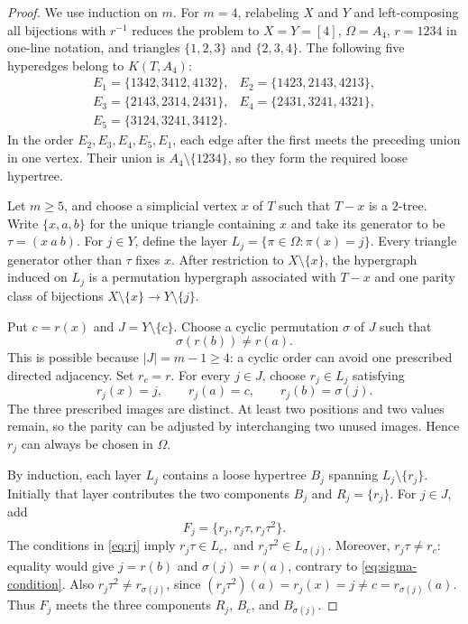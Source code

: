 \documentclass[10pt,a4paper]{amsart}
\begin{document}
\begin{proof}
We use induction on $m$. For $m=4$, relabeling $X$ and $Y$ and
left-composing all bijections with $r^{-1}$ reduces the problem to
$X=Y=[4]$, $\Omega=A_4$, $r=1234$ in one-line notation, and triangles
$\{1,2,3\}$ and $\{2,3,4\}$. The following five hyperedges belong to
$K(T,A_4)$:
\[
\begin{array}{ll}
 E_1=\{1342,3412,4132\},&
 E_2=\{1423,2143,4213\},\\
 E_3=\{2143,2314,2431\},&
 E_4=\{2431,3241,4321\},\\
 E_5=\{3124,3241,3412\}.&
\end{array}
\]
In the order $E_2,E_3,E_4,E_5,E_1$, each edge after the first meets the
preceding union in one vertex. Their union is $A_4\setminus\{1234\}$, so
they form the required loose hypertree.

Let $m\geq5$, and choose a simplicial vertex $x$ of $T$ such that $T-x$ is a
$2$-tree. Write $\{x,a,b\}$ for the unique triangle containing $x$ and take
its generator to be
$
 \tau=(x\ a\ b).
$
For $j\in Y$, define the layer
$
 L_j=\{\pi\in\Omega:\pi(x)=j\}.
$
Every triangle generator other than $\tau$ fixes $x$. After restriction to
$X\setminus\{x\}$, the hypergraph induced on $L_j$ is a permutation
hypergraph associated with $T-x$ and one parity class of bijections
$X\setminus\{x\}\to Y\setminus\{j\}$.

Put $c=r(x)$ and $J=Y\setminus\{c\}$. Choose a cyclic permutation $\sigma$
of $J$ such that
\begin{equation}\label{eq:sigma-condition}
 \sigma(r(b))\neq r(a).
\end{equation}
This is possible because $|J|=m-1\geq4$: a cyclic order can avoid one
prescribed directed adjacency. Set $r_c=r$. For every $j\in J$, choose
$r_j\in L_j$ satisfying
\begin{equation}\label{eq:rj}
 r_j(x)=j,\qquad r_j(a)=c,\qquad r_j(b)=\sigma(j).
\end{equation}
The three prescribed images are distinct. At least two positions and two
values remain, so the parity can be adjusted by interchanging two unused
images. Hence $r_j$ can always be chosen in $\Omega$.

By induction, each layer $L_j$ contains a loose hypertree $B_j$ spanning
$L_j\setminus\{r_j\}$. Initially that layer contributes the two components
$B_j$ and $R_j=\{r_j\}$. For $j\in J$, add
\begin{equation}\label{eq:Fj}
 F_j=\{r_j,r_j\tau,r_j\tau^2\}.
\end{equation}
The conditions in \eqref{eq:rj} imply
$
 r_j\tau\in L_c,$ and $ r_j\tau^2\in L_{\sigma(j)}.
$
Moreover, $r_j\tau\neq r_c$: equality would give
$j=r(b)$ and $\sigma(j)=r(a)$, contrary to
\eqref{eq:sigma-condition}. Also $r_j\tau^2\neq r_{\sigma(j)}$, since
$
 (r_j\tau^2)(a)=r_j(x)=j\neq c=r_{\sigma(j)}(a).
$
Thus $F_j$ meets the three components $R_j$, $B_c$, and
$B_{\sigma(j)}$.


\end{proof}
\end{document}
